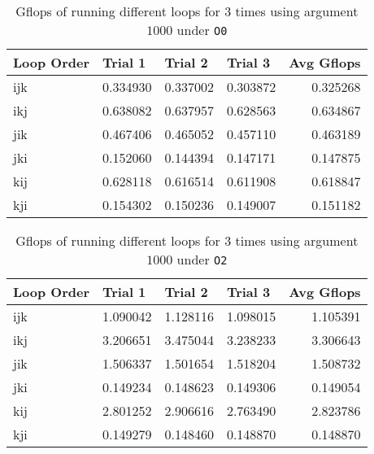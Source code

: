 \documentclass[12pt]{article}
\begin{document}
\begin{table}[H]
  \centering
  \begin{tabular}{lrrrr}
    \toprule
    \multicolumn{1}{l}{Loop Order} &
    \multicolumn{1}{l}{Trial 1}    &
    \multicolumn{1}{l}{Trial 2}    &
    \multicolumn{1}{l}{Trial 3}    &
    \multicolumn{1}{l}{Avg Gflops}                                             \\
    \midrule
    ijk                            & 0.334930 & 0.337002 & 0.303872 & 0.325268 \\
    ikj                            & 0.638082 & 0.637957 & 0.628563 & 0.634867 \\
    jik                            & 0.467406 & 0.465052 & 0.457110 & 0.463189 \\
    jki                            & 0.152060 & 0.144394 & 0.147171 & 0.147875 \\
    kij                            & 0.628118 & 0.616514 & 0.611908 & 0.618847 \\
    kji                            & 0.154302 & 0.150236 & 0.149007 & 0.151182 \\
    \bottomrule
  \end{tabular}
  \caption{Gflops of running different loops for 3 times using argument $1000$ under \lstinline{O0}}
\end{table}
\begin{table}[H]
  \centering
  \begin{tabular}{lrrrr}
    \toprule
    \multicolumn{1}{l}{Loop Order} &
    \multicolumn{1}{l}{Trial 1}    &
    \multicolumn{1}{l}{Trial 2}    &
    \multicolumn{1}{l}{Trial 3}    &
    \multicolumn{1}{l}{Avg Gflops}                                             \\
    \midrule
    ijk                            & 1.090042 & 1.128116 & 1.098015 & 1.105391 \\
    ikj                            & 3.206651 & 3.475044 & 3.238233 & 3.306643 \\
    jik                            & 1.506337 & 1.501654 & 1.518204 & 1.508732 \\
    jki                            & 0.149234 & 0.148623 & 0.149306 & 0.149054 \\
    kij                            & 2.801252 & 2.906616 & 2.763490 & 2.823786 \\
    kji                            & 0.149279 & 0.148460 & 0.148870 & 0.148870 \\
    \bottomrule
  \end{tabular}
  \caption{Gflops of running different loops for 3 times using argument $1000$ under \lstinline{O2}}
\end{table}
\end{document}
